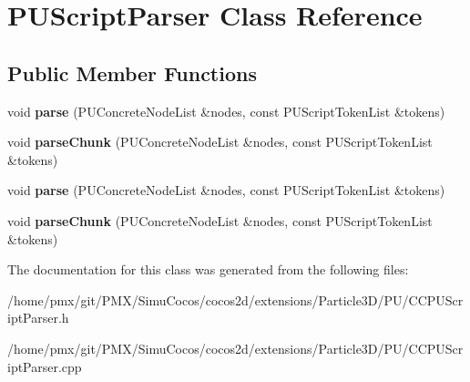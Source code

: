 \hypertarget{classPUScriptParser}{}\section{P\+U\+Script\+Parser Class Reference}
\label{classPUScriptParser}
\subsection*{Public Member Functions}
\begin{DoxyCompactItemize}
\item 
\mbox{\label{classPUScriptParser_a68ba1df9dea5fe21c9aad7fcfcdf5dbf}} 
void {\bfseries parse} (P\+U\+Concrete\+Node\+List \&nodes, const P\+U\+Script\+Token\+List \&tokens)
\item 
\mbox{\label{classPUScriptParser_ac7a09aab9c59b4bb7ba818431c27292b}} 
void {\bfseries parse\+Chunk} (P\+U\+Concrete\+Node\+List \&nodes, const P\+U\+Script\+Token\+List \&tokens)
\item 
\mbox{\label{classPUScriptParser_a68ba1df9dea5fe21c9aad7fcfcdf5dbf}} 
void {\bfseries parse} (P\+U\+Concrete\+Node\+List \&nodes, const P\+U\+Script\+Token\+List \&tokens)
\item 
\mbox{\label{classPUScriptParser_ac7a09aab9c59b4bb7ba818431c27292b}} 
void {\bfseries parse\+Chunk} (P\+U\+Concrete\+Node\+List \&nodes, const P\+U\+Script\+Token\+List \&tokens)
\end{DoxyCompactItemize}


The documentation for this class was generated from the following files\+:\begin{DoxyCompactItemize}
\item 
/home/pmx/git/\+P\+M\+X/\+Simu\+Cocos/cocos2d/extensions/\+Particle3\+D/\+P\+U/C\+C\+P\+U\+Script\+Parser.\+h\item 
/home/pmx/git/\+P\+M\+X/\+Simu\+Cocos/cocos2d/extensions/\+Particle3\+D/\+P\+U/C\+C\+P\+U\+Script\+Parser.\+cpp\end{DoxyCompactItemize}
